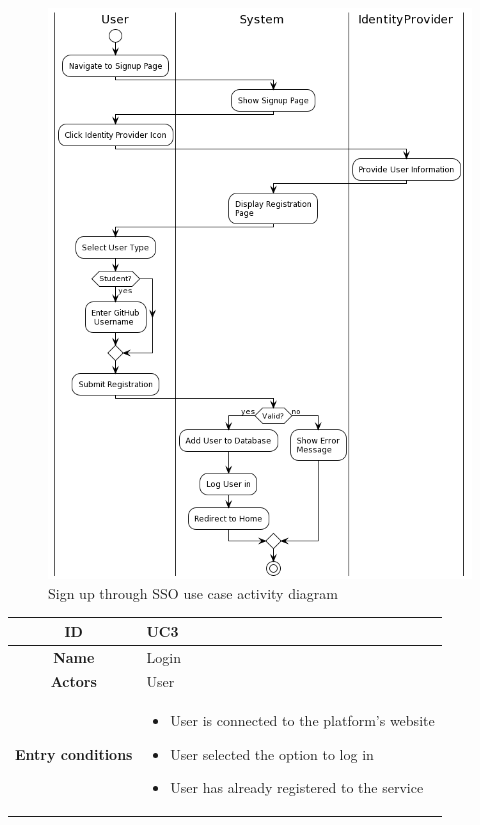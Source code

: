 \begin{center}
\begin{figure}[H]
        \includegraphics[scale=0.5]{Diagrams/activity_signupsso.png}
        \caption{Sign up through SSO use case activity diagram}
    \end{figure}
    \begin{tabular}{ |c|m{10cm}| }
        \hline
        \textbf{ID} & UC3 \\
        \hline
        \textbf{Name} & Login \\
        \hline
        \textbf{Actors} & User \\
        \hline
        \textbf{Entry conditions} &
        \begin{itemize}
            \item User is connected to the platform’s website
            \item User selected the option to log in
            \item User has already registered to the service
        \end{itemize} \\

\end{tabular}
\end{center}
